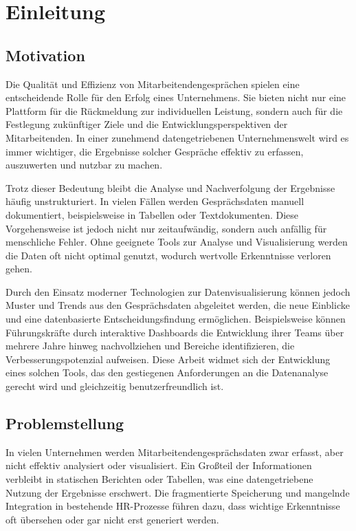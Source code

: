 \chapter{Einleitung}
\label{chap:einleitung}

\section{Motivation}
Die Qualität und Effizienz von Mitarbeitendengesprächen spielen eine entscheidende Rolle für den Erfolg eines Unternehmens. Sie bieten nicht nur eine Plattform für die Rückmeldung zur individuellen Leistung, sondern auch für die Festlegung zukünftiger Ziele und die Entwicklungsperspektiven der Mitarbeitenden. In einer zunehmend datengetriebenen Unternehmenswelt wird es immer wichtiger, die Ergebnisse solcher Gespräche effektiv zu erfassen, auszuwerten und nutzbar zu machen.

Trotz dieser Bedeutung bleibt die Analyse und Nachverfolgung der Ergebnisse häufig unstrukturiert. In vielen Fällen werden Gesprächsdaten manuell dokumentiert, beispielsweise in Tabellen oder Textdokumenten. Diese Vorgehensweise ist jedoch nicht nur zeitaufwändig, sondern auch anfällig für menschliche Fehler. Ohne geeignete Tools zur Analyse und Visualisierung werden die Daten oft nicht optimal genutzt, wodurch wertvolle Erkenntnisse verloren gehen.

Durch den Einsatz moderner Technologien zur Datenvisualisierung können jedoch Muster und Trends aus den Gesprächsdaten abgeleitet werden, die neue Einblicke und eine datenbasierte Entscheidungsfindung ermöglichen. Beispielsweise können Führungskräfte durch interaktive Dashboards die Entwicklung ihrer Teams über mehrere Jahre hinweg nachvollziehen und Bereiche identifizieren, die Verbesserungspotenzial aufweisen. Diese Arbeit widmet sich der Entwicklung eines solchen Tools, das den gestiegenen Anforderungen an die Datenanalyse gerecht wird und gleichzeitig benutzerfreundlich ist.

\section{Problemstellung}
In vielen Unternehmen werden Mitarbeitendengesprächsdaten zwar erfasst, aber nicht effektiv analysiert oder visualisiert. Ein Großteil der Informationen verbleibt in statischen Berichten oder Tabellen, was eine datengetriebene Nutzung der Ergebnisse erschwert. Die fragmentierte Speicherung und mangelnde Integration in bestehende HR-Prozesse führen dazu, dass wichtige Erkenntnisse oft übersehen oder gar nicht erst generiert werden.


